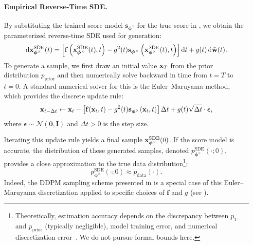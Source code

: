 \paragraph{Empirical Reverse-Time SDE.}  
By substituting the trained score model $\mathbf{s}_{\bm{\phi}^\times}$ for the true score in , we obtain the parameterized reverse-time SDE used for generation:
\begin{equation}\label{eq:sde_backward_sub}
    \mathop{}\!\mathrm{d} {\mathbf{x}}^{\mathrm{SDE}}_{\bm{\phi}^\times}(t) = \left[\mathbf{f}\left({\mathbf{x}}^{\mathrm{SDE}}_{\bm{\phi}^\times}(t), t\right) - g^2(t) \mathbf{s}_{\bm{\phi}^\times}\left({\mathbf{x}}^{\mathrm{SDE}}_{\bm{\phi}^\times}(t), t\right) \right] \mathop{}\!\mathrm{d} t + g(t) \mathop{}\!\mathrm{d} \bar{{\mathbf{w}}}(t).
\end{equation}
To generate a sample, we first draw an initial value ${\mathbf{x}}_T$ from the prior distribution $p_{\mathrm{prior}}$ and then numerically solve  backward in time from $t=T$ to $t=0$. A standard numerical solver for this is the Euler–Maruyama method, which provides the discrete update rule:
\begin{equation}\label{eq:euler-maruyama}
{\mathbf{x}}_{t - \Delta t} \leftarrow {\mathbf{x}}_t - \left[ \mathbf{f}({\mathbf{x}}_t, t) - g^2(t)  \mathbf{s}_{\bm{\phi}^\times}({\mathbf{x}}_t, t) \right] \Delta t + g(t) \sqrt{\Delta t} \cdot \boldsymbol{\epsilon},
\end{equation}
where $\boldsymbol{\epsilon} \sim \mathcal{N}(\bm{0}, \mathbf{I})$ and $\Delta t > 0$ is the step size.

Iterating this update rule yields a final sample ${\mathbf{x}}^{\mathrm{SDE}}_{\bm{\phi}^\times}(0)$. If the score model is accurate, the distribution of these generated samples, denoted $p_{\bm{\phi}^\times}^{\mathrm{SDE}}(\cdot; 0)$, provides a close approximation to the true data distribution\footnote{Theoretically, estimation accuracy depends on the discrepancy between $p_T$ and $p_{\mathrm{prior}}$ (typically negligible), model training error, and numerical discretization error~\citep{de2022convergence,wang2024evaluating}. We do not pursue formal bounds here.}:
\[
p_{\bm{\phi}^\times}^{\mathrm{SDE}}(\cdot; 0) \approx p_{\mathrm{data}}(\cdot).
\]
Indeed, the DDPM sampling scheme presented in  is a special case of this Euler–Maruyama discretization applied to specific choices of $\mathbf{f}$ and $g$ (see ).


